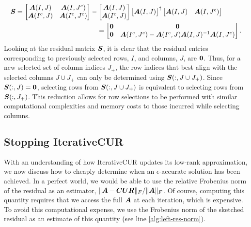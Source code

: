 \begin{align*}
    \boldsymbol{S} = \begin{bmatrix}
        \boldsymbol{A}(I,J) & \boldsymbol{A}(I, J^c)\\
        \boldsymbol{A}(I^c, J) & \boldsymbol{A}(I^c, J^c)
    \end{bmatrix} - 
    &\begin{bmatrix}
        \boldsymbol{A}(I, J)\\
        \boldsymbol{A}(I^c,J)
    \end{bmatrix}
    \begin{bmatrix}
        \boldsymbol{A}(I,J)
    \end{bmatrix}^{\dagger}
    \begin{bmatrix}
        \boldsymbol{A}(I,J) & \boldsymbol{A}(I,J^c)
    \end{bmatrix}\\ &= 
    \begin{bmatrix}
        \boldsymbol{0} & \boldsymbol{0}\\
        \boldsymbol{0} &  \boldsymbol{A}(I^c, J^c) -  \boldsymbol{A}(I^c,J)  \boldsymbol{A}(I,J)^{-1} \boldsymbol{A}(I, J^c)
    \end{bmatrix}.
\end{align*}
Looking at the residual matrix $\boldsymbol{S}$, it is clear that the residual entries corresponding to previously selected rows, $I$, and columns, $J$, are $\boldsymbol{0}$. Thus, for a new selected set of column indices $J_+$, the row indices that best align with the selected columns $J \cup J_+$ can only be determined using $\boldsymbol{S}(:,J\cup J_+)$. Since $\boldsymbol{S}(:,J) = \boldsymbol{0}$, selecting rows from $\boldsymbol{S}(:,J\cup J_+)$ is equivalent to selecting rows from $\boldsymbol{S}(:, J_+)$. This reduction allows for row selections to be performed with similar computational complexities and memory costs to those incurred while selecting columns.


\subsection{Stopping IterativeCUR} \label{subsec:stopping}
With an understanding of how IterativeCUR updates its low-rank approximation, we now discuss how to cheaply determine when an $\epsilon$-accurate solution has been achieved. In a perfect world, we would be able to use the relative Frobenius norm of the residual as an estimator, $\|\boldsymbol{A} - \boldsymbol{C} \boldsymbol{U} \boldsymbol{R}\|_F / \|\boldsymbol{A}\|_F$. Of course, computing this quantity requires that we access the full $\boldsymbol{A}$ at each iteration, which is expensive. To avoid this computational expense, we use the Frobenius norm of the sketched residual as an estimate of this quantity (see line \ref{alg:left-res-norm}). 

